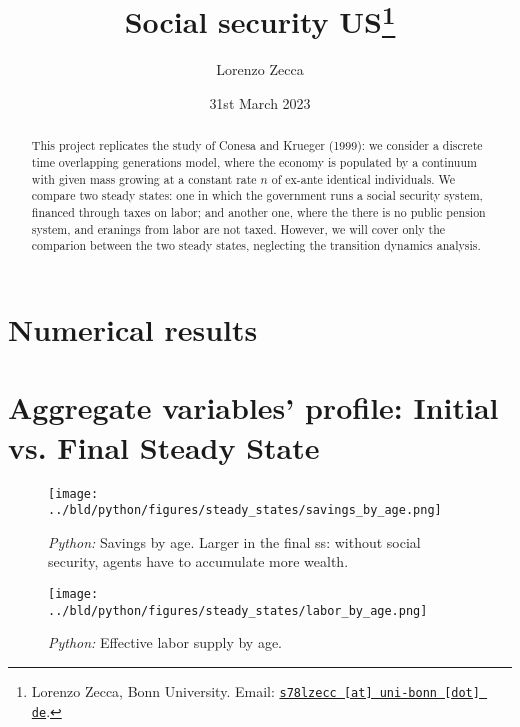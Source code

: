 \documentclass[11pt, a4paper, leqno]{article}
\begin{document}
\title{Social security US\thanks{Lorenzo Zecca, Bonn University. Email: \href{mailto:s78lzecc@uni-bonn.de}{\nolinkurl{s78lzecc [at] uni-bonn [dot] de}}.}}

\author{Lorenzo Zecca}

\date{
    31st March 2023
}

\maketitle


\begin{abstract}
    This project replicates the study of Conesa and Krueger (1999): we consider a discrete time overlapping generations model, 
    where the economy is populated by a continuum with given mass 
    growing at a constant rate $n$ of ex-ante identical individuals.
    We compare two steady states: 
    one in which the government runs a social security system, financed 
    through taxes on labor; and another one, where the there is no public 
    pension system, and eranings from labor are not taxed. However, we will cover only 
    the comparion between the two steady states, neglecting the transition dynamics analysis.
\end{abstract}

\clearpage


\section{Numerical results} %


\begin{table}[!htb]

\end{table}
\section{Aggregate variables' profile: Initial vs. Final Steady State}

\begin{figure}

    \centering
    \texttt{[image: ../bld/python/figures/steady\_states/savings\_by\_age.png]}
    \caption{\emph{Python:} Savings by age. Larger in the final ss: without social security, agents have to accumulate more wealth.}
    \label{fig:python-K}
\end{figure}

\begin{figure}
    
    \centering
    \texttt{[image: ../bld/python/figures/steady\_states/labor\_by\_age.png]}
    \caption{\emph{Python:} Effective labor supply by age.}
    \label{fig:python-L}

\end{figure}
\end{document}
